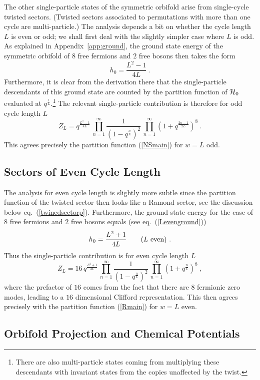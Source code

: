 \documentclass[12pt,a4paper]{article}
\newcommand{\be}{ \begin{equation}}
\newcommand{\ee}{\end{equation}}
\begin{document}
The other single-particle states of the symmetric orbifold arise from single-cycle twisted sectors. (Twisted sectors associated to permutations with more than one cycle are multi-particle.) The analysis depends a bit on whether the cycle length $L$ is even or odd; we shall first deal with the slightly simpler case where $L$ is odd. As explained in Appendix~\ref{app:ground}, the ground state energy of the symmetric orbifold of $8$ free fermions and $2$ free bosons then takes the form 
\be
h_0 = \frac{L^2-1}{4L} \ .
\ee
Furthermore, it is clear from the derivation there that the single-particle descendants of this ground state are counted by the partition function of ${\cal H}_0$ evaluated at $q^{\frac{1}{L}}$.\footnote{There are also multi-particle states coming from multiplying these descendants with invariant states from the copies unaffected by the twist.} The relevant single-particle contribution is therefore for odd cycle length $L$
\be
Z_L = q^{\frac{L^2-1}{4L}} \, \prod_{n=1}^\infty \frac{1}{(1-q^{\frac{n}{L}})^2} \,  \prod_{n=1}^{\infty} (1 + q^{\frac{2n-1}{2L}})^8 \ . 
\ee
This agrees precisely the partition function (\ref{NSmain}) for $w=L$ odd. 

\subsection{Sectors of Even Cycle Length}\label{sec:symorbeven}

The analysis for even cycle length is slightly more subtle since the partition function of the twisted sector then looks like a Ramond sector, see the discussion below eq.~(\ref{twinedsectorp}). Furthermore, the ground state energy for the case of $8$ free fermions and $2$ free bosons equals (see eq.~(\ref{Levenground})) 
\be\label{Levengroundm}
h_0 = \frac{L^2+1}{4L} \qquad \hbox{($L$ even)}  \ .
\ee
Thus the single-particle contribution is for even cycle length $L$
\be
Z_L = 16\, q^{\frac{L^2+1}{4L}} \, \prod_{n=1}^\infty \frac{1}{(1-q^{\frac{n}{L}})^2} \,  \prod_{n=1}^{\infty} (1 + q^{\frac{n}{L}})^8 \ ,
\ee
where the prefactor of $16$ comes from the fact that there are $8$ fermionic zero modes, leading to a $16$ dimensional Clifford representation. This then 
agrees precisely with the partition function (\ref{Rmain}) for $w=L$ even.

\subsection{Orbifold Projection and Chemical Potentials}
\end{document}
